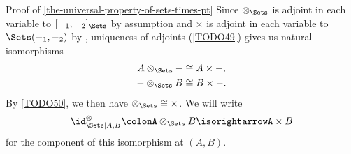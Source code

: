 \begin{Proof}{Proof of \cref{the-universal-property-of-sets-times-pt}}
    Since $\otimes_{\Sets}$ is adjoint in each variable to $[-_{1},-_{2}]_{\Sets}$ by assumption and $\times$ is adjoint in each variable to $\Sets(-_{1},-_{2})$ by , uniqueness of adjoints (\cref{TODO49}) gives us natural isomorphisms
    \begin{align*}
        A\otimes_{\Sets}- &\cong A\times-,\\
        -\otimes_{\Sets}B &\cong B\times-.
    \end{align*}
    By \cref{TODO50}, we then have $\mathord{\otimes_{\Sets}}\cong\mathord{\times}$. We will write
    \[
        \id^{\otimes}_{\Sets|A,B}%
        \colon%
        A\otimes_{\Sets}B%
        \isorightarrow%
        A\times B%
    \]%
    for the component of this isomorphism at $(A,B)$.


\end{Proof}
